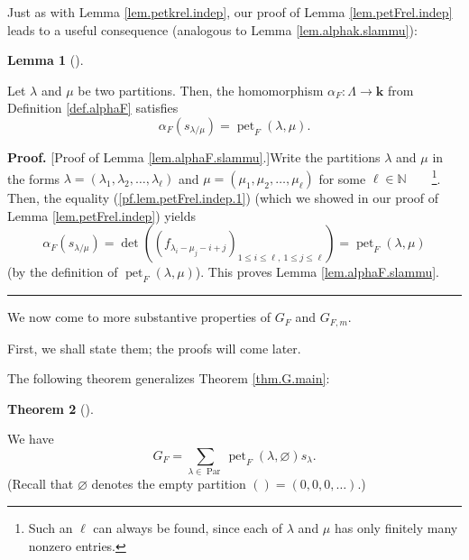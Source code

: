 \documentclass[numbers=enddot,12pt,final,onecolumn,notitlepage]{scrartcl}%
\theoremstyle{definition}
\newtheorem{theo}{Theorem}[section]
\newenvironment{theorem}[1][]
{\begin{theo}[#1]\begin{leftbar}}
{\end{leftbar}\end{theo}}
\newtheorem{lem}[theo]{Lemma}
\newenvironment{lemma}[1][]
{\begin{lem}[#1]\begin{leftbar}}
{\end{leftbar}\end{lem}}
\newenvironment{proof}[1][Proof]{\noindent\textbf{#1.} }{\ \rule{0.5em}{0.5em}}
\let\sumnonlimits\sum
\renewcommand{\sum}{\sumnonlimits\limits}
\newenvironment{verlong}{}{}
\begin{document}
\begin{verlong}
Just as with Lemma \ref{lem.petkrel.indep}, our proof of Lemma
\ref{lem.petFrel.indep} leads to a useful consequence (analogous to Lemma
\ref{lem.alphak.slammu}):

\begin{lemma}
\label{lem.alphaF.slammu}Let $\lambda$ and $\mu$ be two partitions. Then, the
homomorphism $\alpha_{F}:\Lambda\rightarrow\mathbf{k}$ from Definition
\ref{def.alphaF} satisfies%
\begin{equation}
\alpha_{F}\left(  s_{\lambda/\mu}\right)  =\operatorname*{pet}\nolimits_{F}%
\left(  \lambda,\mu\right)  . \label{pf.thm.GF.pieri.alks}%
\end{equation}

\end{lemma}

\begin{proof}
[Proof of Lemma \ref{lem.alphaF.slammu}.]Write the partitions $\lambda$ and
$\mu$ in the forms $\lambda=\left(  \lambda_{1},\lambda_{2},\ldots
,\lambda_{\ell}\right)  $ and $\mu=\left(  \mu_{1},\mu_{2},\ldots,\mu_{\ell
}\right)  $ for some $\ell\in\mathbb{N}$\ \ \ \ \footnote{Such an $\ell$ can
always be found, since each of $\lambda$ and $\mu$ has only finitely many
nonzero entries.}. Then, the equality (\ref{pf.lem.petFrel.indep.1}) (which we
showed in our proof of Lemma \ref{lem.petFrel.indep}) yields%
\[
\alpha_{F}\left(  s_{\lambda/\mu}\right)  =\det\left(  \left(  f_{\lambda
_{i}-\mu_{j}-i+j}\right)  _{1\leq i\leq\ell,\ 1\leq j\leq\ell}\right)
=\operatorname*{pet}\nolimits_{F}\left(  \lambda,\mu\right)
\]
(by the definition of $\operatorname*{pet}\nolimits_{F}\left(  \lambda
,\mu\right)  $). This proves Lemma \ref{lem.alphaF.slammu}.
\end{proof}
\end{verlong}

We now come to more substantive properties of $G_{F}$ and $G_{F,m}$.

\begin{verlong}
First, we shall state them; the proofs will come later.
\end{verlong}

The following theorem generalizes Theorem \ref{thm.G.main}:

\begin{theorem}
\label{thm.GF.main}We have%
\[
G_{F}=\sum_{\lambda\in\operatorname*{Par}}\operatorname*{pet}\nolimits_{F}%
\left(  \lambda,\varnothing\right)  s_{\lambda}.
\]
(Recall that $\varnothing$ denotes the empty partition $\left(  {}\right)
=\left(  0,0,0,\ldots\right)  $.)
\end{theorem}
\end{document}
